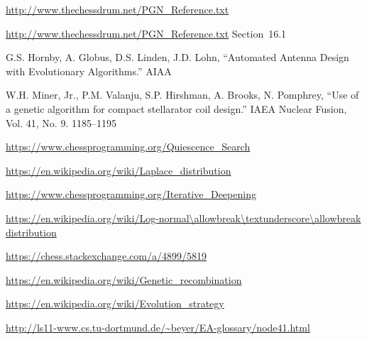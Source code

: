 \documentclass[letterpaper]{article}
\renewcommand{\_}{\allowbreak\textunderscore\allowbreak}
\begin{document}
\begin{thebibliography}{99}

\url{http://www.thechessdrum.net/PGN_Reference.txt}

\url{http://www.thechessdrum.net/PGN_Reference.txt} Section~16.1

G.S. Hornby, A. Globus, D.S. Linden, J.D. Lohn, ``Automated Antenna Design with Evolutionary Algorithms.'' AIAA

W.H. Miner, Jr., P.M. Valanju, S.P. Hirshman, A. Brooks, N. Pomphrey, ``Use of a genetic algorithm for compact stellarator coil design.'' IAEA Nuclear Fusion, Vol. 41, No. 9. 1185--1195

\url{https://www.chessprogramming.org/Quiescence_Search}

\url{https://en.wikipedia.org/wiki/Laplace_distribution}

\url{https://www.chessprogramming.org/Iterative_Deepening}

\url{https://en.wikipedia.org/wiki/Log-normal\_distribution}

\url{https://chess.stackexchange.com/a/4899/5819}

\url{https://en.wikipedia.org/wiki/Genetic_recombination}

\url{https://en.wikipedia.org/wiki/Evolution_strategy}

\url{http://ls11-www.cs.tu-dortmund.de/~beyer/EA-glossary/node41.html}

\end{thebibliography}
\end{document}
